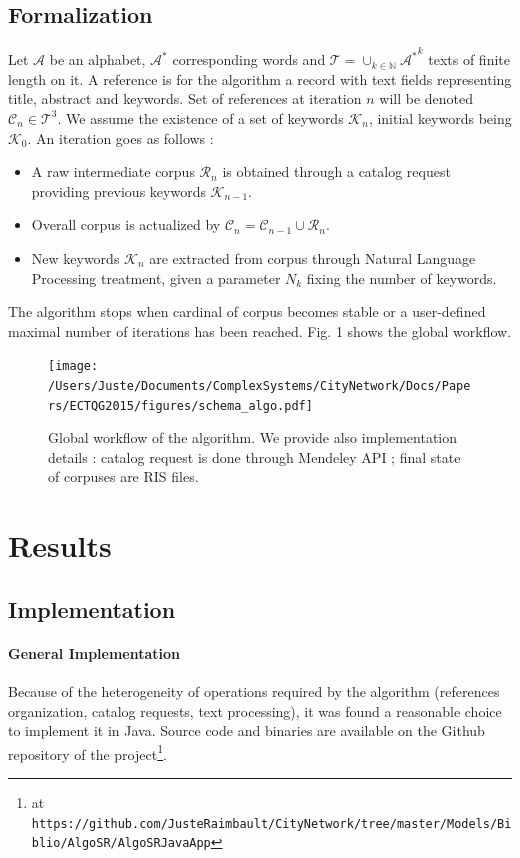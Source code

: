 \subsection{Formalization}
Let $\mathcal{A}$ be an alphabet, $\mathcal{A}^{\ast}$ corresponding words and $\mathcal{T}=\cup_{k\in \mathbb{N}}{\mathcal{A}^{\ast}}^k$ texts of finite length on it. A reference is for the algorithm a record with text fields representing title, abstract and keywords. Set of references at iteration $n$ will be denoted $\mathcal{C}_{n}\in \mathcal{T}^3$. We assume the existence of a set of keywords $\mathcal{K}_n$, initial keywords being $\mathcal{K}_0$. An iteration goes as follows :
\begin{itemize}
\item A raw intermediate corpus $\mathcal{R}_n$ is obtained through a catalog request providing previous keywords $\mathcal{K}_{n-1}$.
\item Overall corpus is actualized by $\mathcal{C}_n = \mathcal{C}_{n-1} \cup \mathcal{R}_n$.
\item New keywords $\mathcal{K}_n$ are extracted from corpus through Natural Language Processing treatment, given a parameter $N_k$ fixing the number of keywords.
\end{itemize}

The algorithm stops when cardinal of corpus becomes stable or a user-defined maximal number of iterations has been reached. Fig. 1 shows the global workflow.

\begin{figure}
\centering
\texttt{[image: /Users/Juste/Documents/ComplexSystems/CityNetwork/Docs/Papers/ECTQG2015/figures/schema\_algo.pdf]}
\caption{Global workflow of the algorithm. We provide also implementation details : catalog request is done through Mendeley API ; final state of corpuses are RIS files.}
\label{fig:algo}
\end{figure}




\section{Results}

\subsection{Implementation}

\paragraph{General Implementation}
Because of the heterogeneity of operations required by the algorithm (references organization, catalog requests, text processing), it was found a reasonable choice to implement it in Java. Source code and binaries are available on the Github repository of the project\footnote{at \texttt{https://github.com/JusteRaimbault/CityNetwork/tree/master/Models/Biblio/AlgoSR/AlgoSRJavaApp}}.


